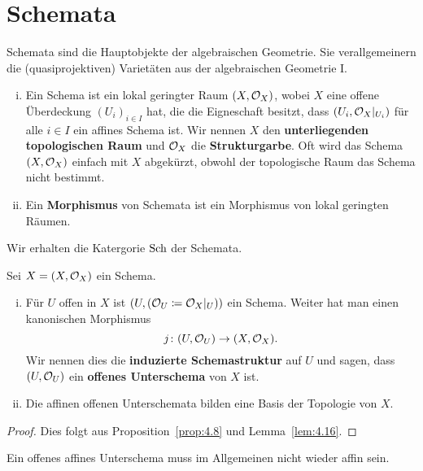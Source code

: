 
\chapter{Schemata}

Schemata sind die Hauptobjekte der algebraischen Geometrie. Sie verallgemeinern die (quasiprojektiven) Varietäten aus der algebraischen Geometrie I.

\begin{defn}
\label{defn:5.1}
	\begin{enumerate}[i)]
		\item Ein Schema ist ein lokal geringter Raum $(X,\mathcal{O}_X)$, wobei $X$ eine offene Überdeckung $(U_i)_{i\in I}$ hat, die die Eigneschaft besitzt, dass $(U_i,\mathcal{O}_{X}\vert_{U_i})$ für alle $i \in I$ ein affines Schema ist. Wir nennen $X$ den \textbf{unterliegenden topologischen Raum} und $\mathcal{O}_X$ die \textbf{Strukturgarbe}. Oft wird das Schema $(X,\mathcal{O}_X)$ einfach mit $X$ abgekürzt, obwohl der topologische Raum das Schema nicht bestimmt.
		\item Ein \textbf{Morphismus} von Schemata ist ein Morphismus von lokal geringten Räumen.
	\end{enumerate}
	Wir erhalten die Katergorie $\operatorname{Sch}$ der Schemata.
\end{defn}

\begin{prop}
	Sei $X = (X,\mathcal{O}_X)$ ein Schema.
	\begin{enumerate}[i)]
		\item Für $U$ offen in $X$ ist $(U,(\mathcal{O}_U \coloneqq \mathcal{O}_X\vert_U))$ ein Schema. Weiter hat man einen kanonischen Morphismus
		\[
			j\colon (U,\mathcal{O}_U) \to (X,\mathcal{O}_X).
		\]
		Wir nennen dies die \textbf{induzierte Schemastruktur} auf $U$ und sagen, dass $(U,\mathcal{O}_U)$ ein \textbf{offenes Unterschema} von $X$ ist.
		\item Die affinen offenen Unterschemata bilden eine Basis der Topologie von $X$.
	\end{enumerate}
	\begin{proof}
		Dies folgt aus Proposition~\ref{prop:4.8} und Lemma~\ref{lem:4.16}.
	\end{proof}
\end{prop}

\begin{bem}
	Ein offenes affines Unterschema muss im Allgemeinen nicht wieder affin sein.
\end{bem}

